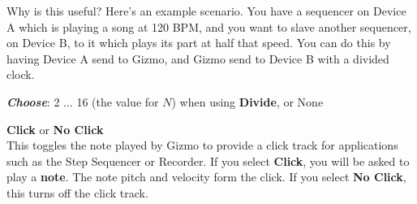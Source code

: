 \documentclass{article}
\begin{document}
\begin{description}
Why is this useful?  Here's an example scenario.  You have a sequencer on Device A which is playing a song at 120 BPM, and you want to slave another sequencer, on Device B, to it which plays its part at half that speed.  You can do this by having Device A send to Gizmo, and Gizmo send to Device B with a divided clock.

			\begin{description}
					\item{\bf \textit{Choose}}: 2 ... 16 (the value for \(N\)) when using {\bf Divide}, or None\hspace{1.45in}
			\end{description}


%	

		
	\item{\bf Click} or {\bf No Click}\\
		This toggles the note played by Gizmo to provide a click track for applications such as the Step Sequencer or Recorder.  If you select {\bf Click}, you will be asked to play a {\bf note}.  The note pitch and velocity form the click.  If you select {\bf No Click}, this turns off the click track.
		

\end{description}
\end{document}
